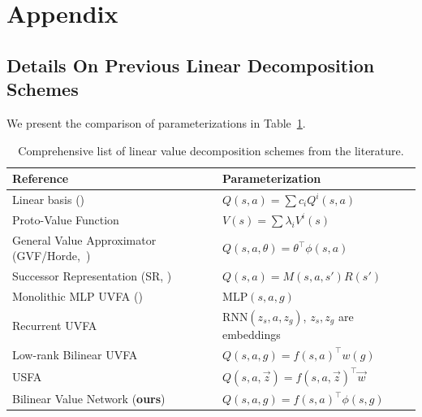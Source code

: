 \documentclass[dvipsnames]{article} %
\theoremstyle{definition}
\theoremstyle{remark}
\begin{document}



\newpage

\appendix
\section{Appendix}

\subsection{Details On Previous Linear Decomposition Schemes}

We present the comparison of parameterizations in Table~\ref{tab:linear_value_decomposition_full}.
\begin{table}[tb!]%
\caption{Comprehensive list of linear value decomposition schemes from the literature.}\label{tab:linear_value_decomposition_full}
\vspace{-1em}
\footnotesize\center%
\begin{tabular}{l|l}\toprule
    \textbf{Reference} & \textbf{Parameterization} \\
    \midrule
    Linear basis (\citeauthor{Sutton2018introduction,Littman2001prs,singh2003psr}) & \hspace{1em}$Q(s,a) = \sum c_i Q^i(s,a)$ \\ 
    Proto-Value Function \citep{Mahadevan2006laplacian,Mahadevan2007proto} & \hspace{1.7em} $V(s) = \sum \lambda_i V^i(s)$ \\
    General Value Approximator (GVF/Horde,~\citealt{sutton2011horde}) & \;$Q(s,a, \theta) = \theta^\top \phi(s,a)$ \\
    Successor Representation (SR, \citealt{Kulkarni2016successor}) & \hspace{1em}\(Q(s, a) = M(s, a, s') R(s')\)  \\
    \midrule
    Monolithic MLP UVFA (\citeauthor{Schaul2015UVFA,Andrychowicz2017her}) & $\mathrm{MLP}(s,a,g)$ \\
    Recurrent UVFA \citep{mirowski2016learning} & $\mathrm{RNN}(z_s, a, z_g)$, \(z_s, z_g\) are embeddings \\
    Low-rank Bilinear UVFA \citep{Schaul2015UVFA} & $Q(s, a, g) = f(s, a)^\top w(g)$ \\
    USFA~\citep{Borsa2018USFA} & $Q(s, a, \vec z) = f(s, a, \vec z)^\top \vec w$  \\
    \midrule
    Bilinear Value Network (\textbf{ours}) & $Q(s, a, g) = f(s, a)^\top \phi(s, g)$ \\
    \bottomrule
\end{tabular}%
\end{table}
\end{document}
